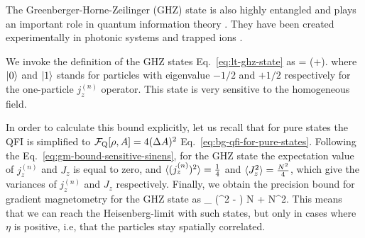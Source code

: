 
The Greenberger-Horne-Zeilinger (GHZ) state is also highly entangled and plays an important role in quantum information theory \cite{Greenberger1990}.
They have been created experimentally in photonic systems \cite{Pan2000,Yao2012,Lu2007} and trapped ions \cite{Sackett2000,Monz2011}.

We invoke the definition of the GHZ states Eq.~\eqref{eq:lt-ghz-state} as
\be
  \ket{\ghz} = (+).
\ee
where $\vert{0}\rangle$ and $\vert{1}\rangle$ stands for particles with eigenvalue $-1/2$ and $+1/2$ respectively for the one-particle $j_z^{(n)}$ operator.
This state is very sensitive to the homogeneous field.

In order to calculate this bound explicitly, let us recall that for pure states the QFI is simplified to $\mathcal{F}_{\textnormal{Q}}[{\textstyle \rho,A}]=4(\Delta A )^2$ Eq.~\eqref{eq:bg-qfi-for-pure-states}.
Following the Eq.~\eqref{eq:gm-bound-sensitive-sinens}, for the GHZ state the expectation value of $j_z^{(n)}$ and
$J_z$ is equal to zero, and $\langle{(j_z^{(n)})^2}\rangle=\frac{1}{4}$ and $\langle{J_z^2}\rangle
= \frac{N^2}{4}$, which give the variances of $j_z^{(n)}$ and $J_z$ respectively.
Finally, we obtain the precision bound for gradient magnetometry for the GHZ state as
\be
\label{eq:gm-precision bound for ghz}
_{\ghz} \leqslant (\sigma^2 - \eta) N  + \eta N^2.
\ee
This means that we can reach the Heisenberg-limit with such states, but only in
cases where $\eta$ is positive, i.e, that the particles stay spatially correlated.
